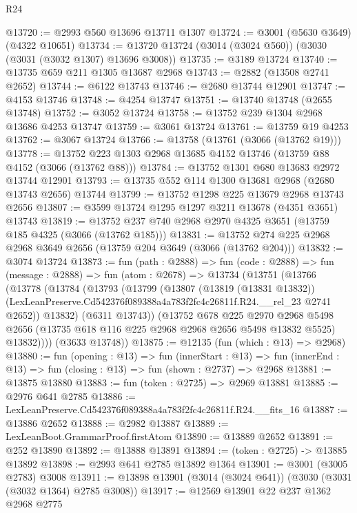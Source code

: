 \begin{lexlean}{R24}
\begin{coremodule}
@13720 := @2993 @560 @13696 @13711 @1307
@13724 := @3001 (@5630 @3649) (@4322 @10651)
@13734 := @13720 @13724 (@3014 (@3024 @560)) (@3030 (@3031 (@3032 @1307) @13696 @3008))
@13735 := @3189 @13724
@13740 := @13735 @659 @211 @1305 @13687 @2968
@13743 := @2882 (@13508 @2741 @2652)
@13744 := @6122 @13743
@13746 := @2680 @13744 @12901
@13747 := @4153 @13746
@13748 := @4254 @13747
@13751 := @13740 @13748 (@2655 @13748)
@13752 := @3052 @13724
@13758 := @13752 @239 @1304 @2968 @13686 @4253 @13747
@13759 := @3061 @13724
@13761 := @13759 @19 @4253
@13762 := @3067 @13724
@13766 := @13758 (@13761 (@3066 (@13762 @19)))
@13778 := @13752 @223 @1303 @2968 @13685 @4152 @13746 (@13759 @88 @4152 (@3066 (@13762 @88)))
@13784 := @13752 @1301 @680 @13683 @2972 @13744 @12901
@13793 := @13735 @552 @114 @1300 @13681 @2968 (@2680 @13743 @2656) @13744
@13799 := @13752 @1298 @225 @13679 @2968 @13743 @2656
@13807 := @3599 @13724 @1295 @1297 @3211 @13678 (@4351 @3651) @13743
@13819 := @13752 @237 @740 @2968 @2970 @4325 @3651 (@13759 @185 @4325 (@3066 (@13762 @185)))
@13831 := @13752 @274 @225 @2968 @2968 @3649 @2656 (@13759 @204 @3649 (@3066 (@13762 @204)))
@13832 := @3074 @13724
@13873 := fun (path : @2888) =>
  fun (code : @2888) =>
  fun (message : @2888) =>
  fun (atom : @2678) =>
  @13734
    (@13751
      (@13766
        (@13778
          (@13784
            (@13793
              (@13799
                (@13807
                  (@13819 (@13831 @13832))
                  (LexLeanPreserve.Cd542376f089388a4a783f2fc4c26811f.R24.__rel_23 @2741 @2652))
                @13832)
              (@6311 @13743))
            (@13752
              @678
              @225
              @2970
              @2968
              @5498
              @2656
              (@13735 @618 @116 @225 @2968 @2968 @2656 @5498 @13832 @5525)
              @13832))))
      (@3633 @13748))
@13875 := @12135 (fun (which : @13) => @2968)
@13880 := fun (opening : @13) =>
  fun (innerStart : @13) =>
  fun (innerEnd : @13) => fun (closing : @13) => fun (shown : @2737) => @2968
@13881 := @13875 @13880
@13883 := fun (token : @2725) => @2969 @13881
@13885 := @2976 @641 @2785
@13886 := LexLeanPreserve.Cd542376f089388a4a783f2fc4c26811f.R24.__fits_16
@13887 := @13886 @2652
@13888 := @2982 @13887
@13889 := LexLeanBoot.GrammarProof.firstAtom
@13890 := @13889 @2652
@13891 := @252 @13890
@13892 := @13888 @13891
@13894 := (token : @2725) -> @13885 @13892
@13898 := @2993 @641 @2785 @13892 @1364
@13901 := @3001 (@3005 @2783) @3008
@13911 := @13898 @13901 (@3014 (@3024 @641)) (@3030 (@3031 (@3032 @1364) @2785 @3008))
@13917 := @12569 @13901 @22 @237 @1362 @2968 @2775

\end{coremodule}
\end{lexlean}
